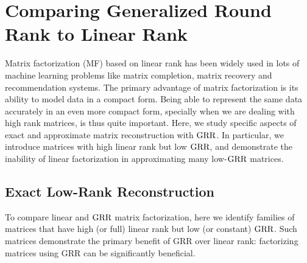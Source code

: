 \documentclass{article}
\newcommand{\sameer}[1]{\todo[color=blue!20]{\textbf{s:} #1}{}}
\begin{document}
\section{Comparing Generalized Round Rank to Linear Rank}
\label{sec:GRR vs LR}

Matrix factorization (MF) based on linear rank has been widely used in lots of machine learning problems like matrix completion, matrix recovery and recommendation systems. The primary advantage of matrix factorization is its ability to model data in a compact form. 
Being able to represent the same data accurately in an even more compact form, specially when we are dealing with high rank matrices, is thus quite important.
Here, we study specific aspects of exact and approximate matrix reconstruction with $\text{GRR}$. 
In particular, we introduce matrices with high linear rank but low $\text{GRR}$, and demonstrate the inability of linear factorization in approximating many low-$\text{GRR}$ matrices.

\subsection{Exact Low-Rank Reconstruction}
To compare linear and $\text{GRR}$ matrix factorization, here we identify families of matrices that have high (or full) linear rank but low (or constant) $\text{GRR}$.
Such matrices demonstrate the primary benefit of GRR over linear rank: factorizing matrices using GRR can be significantly beneficial. %
\end{document}

